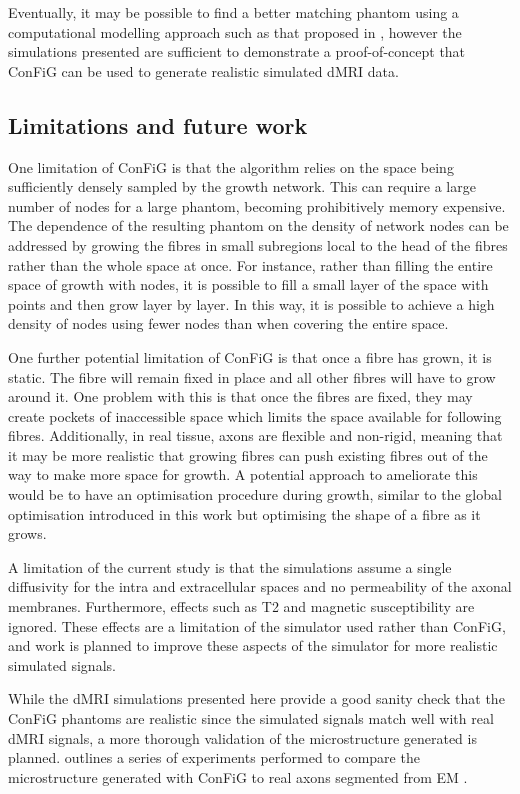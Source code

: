 Eventually, it may be possible to find a better matching phantom using a computational modelling approach such as that proposed in \cite{Nedjati-Gilani2017}, however the simulations presented are sufficient to demonstrate a proof-of-concept that \ac{ConFiG} can be used to generate realistic simulated \ac{dMRI} data.

\subsection*{Limitations and future work}
\label{sec:config_limitations_future}
One limitation of \ac{ConFiG} is that the algorithm relies on the space being sufficiently densely sampled by the growth network. This can require a large number of nodes for a large phantom, becoming prohibitively memory expensive. The dependence of the resulting phantom on the density of network nodes can be addressed by growing the fibres in small subregions local to the head of the fibres rather than the whole space at once. For instance, rather than filling the entire space of growth with nodes, it is possible to fill a small layer of the space with points and then grow layer by layer. In this way, it is possible to achieve a high density of nodes using fewer nodes than when covering the entire space.

One further potential limitation of \ac{ConFiG} is that once a fibre has grown, it is static. The fibre will remain fixed in place and all other fibres will have to grow around it. One problem with this is that once the fibres are fixed, they may create pockets of inaccessible space which limits the space available for following fibres. Additionally, in real tissue, axons are flexible and non-rigid, meaning that it may be more realistic that growing fibres can push existing fibres out of the way to make more space for growth. A potential approach to ameliorate this would be to have an optimisation procedure during growth, similar to the global optimisation introduced in this work but optimising the shape of a fibre as it grows.

A limitation of the current study is that the simulations assume a single diffusivity for the intra and extracellular spaces and no permeability of the axonal membranes. Furthermore, effects such as T2 and magnetic susceptibility are ignored. These effects are a limitation of the simulator used rather than \ac{ConFiG}, and work is planned to improve these aspects of the simulator for more realistic simulated signals.

While the \ac{dMRI} simulations presented here provide a good sanity check that the \ac{ConFiG} phantoms are realistic since the simulated signals match well with real \ac{dMRI} signals, a more thorough validation of the microstructure generated is planned.  outlines a series of experiments performed to compare the microstructure generated with \ac{ConFiG} to real axons segmented from \ac{EM} \cite{Lee2019b}.

